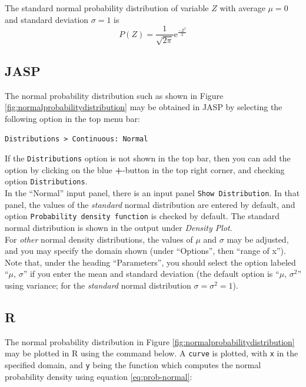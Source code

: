 \documentclass[
]{book}
\begin{document}
The standard normal probability distribution of variable \(Z\) with average
\(\mu=0\) and standard deviation \(\sigma=1\) is
\begin{equation}
    P(Z) = \frac{1}{\sqrt{2\pi}} \mbox{e}^{ \frac{-Z^2}{2} }
  \label{eq:prob-standardnormal}
\end{equation}

\hypertarget{jasp-5}{%
\subsection{JASP}\label{jasp-5}}

The normal probability distribution such as shown in Figure \ref{fig:normalprobabilitydistribution} may be obtained in JASP by selecting the following option in the top menu bar:

\begin{verbatim}
Distributions > Continuous: Normal
\end{verbatim}

If the \texttt{Distributions} option is not shown in the top bar, then you can add the option by clicking on the blue \textbf{+}-button in the top right corner, and checking option \texttt{Distributions}.\\
In the ``Normal'' input panel, there is an input panel \texttt{Show\ Distribution}. In that panel, the values of the \emph{standard} normal distribution are entered by default, and option \texttt{Probability\ density\ function} is checked by default. The standard normal distribution is shown in the output under \emph{Density Plot}.\\
For \emph{other} normal density distributions, the values of \(\mu\) and \(\sigma\) may be adjusted, and you may specify the domain shown (under ``Options'', then ``range of x'').
Note that, under the heading ``Parameters'', you should select the option labeled ``\(\mu\), \(\sigma\)'' if you enter the mean and standard deviation (the default option is ``\(\mu\), \(\sigma^2\)'' using variance; for the \emph{standard} normal distribution \(\sigma=\sigma^2=1\)).

\hypertarget{r-5}{%
\subsection{R}\label{r-5}}

The normal probability distribution in Figure \ref{fig:normalprobabilitydistribution} may be plotted in R using the command below. A \texttt{curve} is plotted, with \texttt{x} in the specified domain, and \texttt{y} being the function which computes the normal probability density using equation \eqref{eq:prob-normal}:
\end{document}
